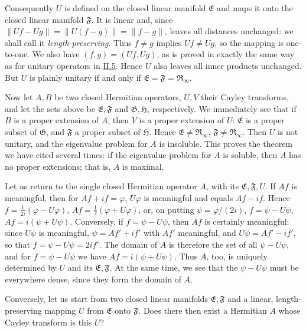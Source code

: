 \documentclass[fontsize=13pt,twoside,openany,headings=normal,parskip=false,bookmarkpackage=false,DIV=calc]{scrbook}
\begin{document}
Consequently $U$ is defined on the closed linear manifold $\mathfrak E$ and maps it onto the closed linear manifold $\mathfrak F$. It is linear and, since $\|Uf-Ug\|=\|U(f-g)\|=\|f-g\|$, leaves all distances unchanged: we shall call it \emph{length-preserving}. Thus $f\ne g$ implies $Uf\ne Ug$, so the mapping is one-to-one. We also have $(f,g)=(Uf,Ug)$, as is proved in exactly the same way as for unitary operators in \hyperref[sec:II.5]{II.5}. Hence $U$ also leaves all inner products unchanged. But $U$ is plainly unitary if and only if $\mathfrak E=\mathfrak F=\mathfrak R_\infty$.

Now let $A,B$ be two closed Hermitian operators, $U,V$ their Cayley transforms, and let the sets above be $\mathfrak E,\mathfrak F$ and $\mathfrak G,\mathfrak H$, respectively. We immediately see that if $B$ is a proper extension of $A$, then $V$ is a proper extension of $U$: $\mathfrak E$ is a proper subset of $\mathfrak G$, and $\mathfrak F$ a proper subset of $\mathfrak H$. Hence $\mathfrak E\ne\mathfrak R_\infty$, $\mathfrak F\ne\mathfrak R_\infty$. Then $U$ is not unitary, and the eigenvalue problem for $A$ is insoluble. This proves the theorem we have cited several times: if the eigenvalue problem for $A$ is soluble, then $A$ has no proper extensions; that is, $A$ is maximal.

Let us return to the single closed Hermitian operator $A$, with its $\mathfrak E,\mathfrak F,U$. If $Af$ is meaningful, then for $Af+if=\varphi$, $U\varphi$ is meaningful and equals $Af-if$. Hence $f=\frac1{2i}(\varphi-U\varphi)$, $Af=\frac12(\varphi+U\varphi)$, or, on putting $\psi=\varphi/(2i)$, $f=\psi-U\psi$, $Af=i(\psi+U\psi)$. Conversely, if $f=\psi-U\psi$, then $Af$ is certainly meaningful: since $U\psi$ is meaningful, $\psi=Af'+if'$ with $Af'$ meaningful, and $U\psi=Af'-if'$, so that $f=\psi-U\psi=2if'$. The domain of $A$ is therefore the set of all $\psi-U\psi$, and for $f=\psi-U\psi$ we have $Af=i(\psi+U\psi)$. Thus $A$, too, is uniquely determined by $U$ and its $\mathfrak E,\mathfrak F$. At the same time, we see that the $\psi-U\psi$ must be everywhere dense, since they form the domain of $A$.

Conversely, let us start from two closed linear manifolds $\mathfrak E,\mathfrak F$ and a linear, length-preserving mapping $U$ from $\mathfrak E$ onto $\mathfrak F$. Does there then exist a Hermitian $A$ whose Cayley transform is this $U$?
\end{document}
